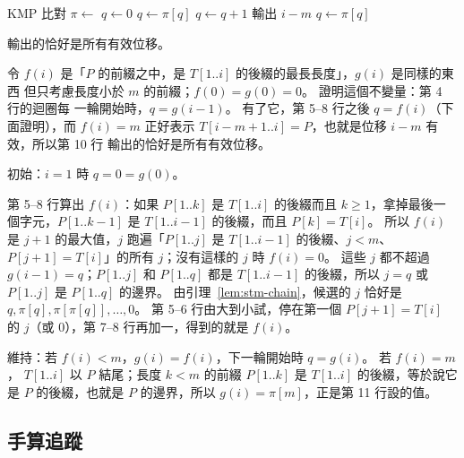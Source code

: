 \begin{pseudo}[label=alg:stm-kmp]{KMP 比對}
    \State $\pi \gets$ 
    \State $q \gets 0$ 
            \State $q \gets \pi[q]$ 
        \EndWhile
            \State $q \gets q + 1$
        \EndIf
            \State 輸出 $i - m$ 
            \State $q \gets \pi[q]$
        \EndIf
    \EndFor
\EndProcedure
\end{pseudo}

\begin{theorem}
\label{thm:stm-kmp-correct}
 輸出的恰好是所有有效位移。
\end{theorem}

\begin{whybox}
令 $f(i)$ 是「$P$ 的前綴之中，是 $T[1..i]$ 的後綴的最長長度」，$g(i)$ 是同樣的東西
但只考慮長度小於 $m$ 的前綴；$f(0) = g(0) = 0$。 證明這個不變量：第 4 行的迴圈每
一輪開始時，$q = g(i - 1)$。 有了它，第 5--8 行之後 $q = f(i)$（下面證明），而
$f(i) = m$ 正好表示 $T[i - m + 1 .. i] = P$，也就是位移 $i - m$ 有效，所以第 10 行
輸出的恰好是所有有效位移。

初始：$i = 1$ 時 $q = 0 = g(0)$。

第 5--8 行算出 $f(i)$：如果 $P[1..k]$ 是 $T[1..i]$ 的後綴而且 $k \ge 1$，拿掉最後一
個字元，$P[1..k - 1]$ 是 $T[1..i - 1]$ 的後綴，而且 $P[k] = T[i]$。 所以 $f(i)$ 是
$j + 1$ 的最大值，$j$ 跑遍「$P[1..j]$ 是 $T[1..i - 1]$ 的後綴、$j < m$、
$P[j + 1] = T[i]$」的所有 $j$；沒有這樣的 $j$ 時 $f(i) = 0$。 這些 $j$ 都不超過
$g(i - 1) = q$；$P[1..j]$ 和 $P[1..q]$ 都是 $T[1..i - 1]$ 的後綴，所以 $j = q$ 或
$P[1..j]$ 是 $P[1..q]$ 的邊界。 由引理~\ref{lem:stm-chain}，候選的 $j$ 恰好是
$q, \pi[q], \pi[\pi[q]], \ldots, 0$。 第 5--6 行由大到小試，停在第一個
$P[j + 1] = T[i]$ 的 $j$（或 $0$），第 7--8 行再加一，得到的就是 $f(i)$。

維持：若 $f(i) < m$，$g(i) = f(i)$，下一輪開始時 $q = g(i)$。 若 $f(i) = m$，
$T[1..i]$ 以 $P$ 結尾；長度 $k < m$ 的前綴 $P[1..k]$ 是 $T[1..i]$ 的後綴，等於說它
是 $P$ 的後綴，也就是 $P$ 的邊界，所以 $g(i) = \pi[m]$，正是第 11 行設的值。
\end{whybox}

\subsection{手算追蹤}

